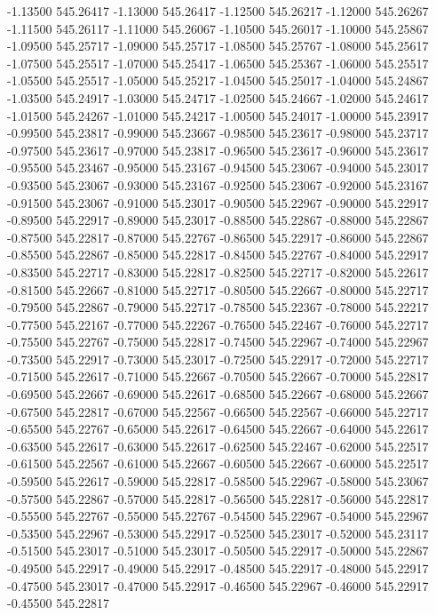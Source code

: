 {-1.13500 545.26417
-1.13000 545.26417
-1.12500 545.26217
-1.12000 545.26267
-1.11500 545.26117
-1.11000 545.26067
-1.10500 545.26017
-1.10000 545.25867
-1.09500 545.25717
-1.09000 545.25717
-1.08500 545.25767
-1.08000 545.25617
-1.07500 545.25517
-1.07000 545.25417
-1.06500 545.25367
-1.06000 545.25517
-1.05500 545.25517
-1.05000 545.25217
-1.04500 545.25017
-1.04000 545.24867
-1.03500 545.24917
-1.03000 545.24717
-1.02500 545.24667
-1.02000 545.24617
-1.01500 545.24267
-1.01000 545.24217
-1.00500 545.24017
-1.00000 545.23917
-0.99500 545.23817
-0.99000 545.23667
-0.98500 545.23617
-0.98000 545.23717
-0.97500 545.23617
-0.97000 545.23817
-0.96500 545.23617
-0.96000 545.23617
-0.95500 545.23467
-0.95000 545.23167
-0.94500 545.23067
-0.94000 545.23017
-0.93500 545.23067
-0.93000 545.23167
-0.92500 545.23067
-0.92000 545.23167
-0.91500 545.23067
-0.91000 545.23017
-0.90500 545.22967
-0.90000 545.22917
-0.89500 545.22917
-0.89000 545.23017
-0.88500 545.22867
-0.88000 545.22867
-0.87500 545.22817
-0.87000 545.22767
-0.86500 545.22917
-0.86000 545.22867
-0.85500 545.22867
-0.85000 545.22817
-0.84500 545.22767
-0.84000 545.22917
-0.83500 545.22717
-0.83000 545.22817
-0.82500 545.22717
-0.82000 545.22617
-0.81500 545.22667
-0.81000 545.22717
-0.80500 545.22667
-0.80000 545.22717
-0.79500 545.22867
-0.79000 545.22717
-0.78500 545.22367
-0.78000 545.22217
-0.77500 545.22167
-0.77000 545.22267
-0.76500 545.22467
-0.76000 545.22717
-0.75500 545.22767
-0.75000 545.22817
-0.74500 545.22967
-0.74000 545.22967
-0.73500 545.22917
-0.73000 545.23017
-0.72500 545.22917
-0.72000 545.22717
-0.71500 545.22617
-0.71000 545.22667
-0.70500 545.22667
-0.70000 545.22817
-0.69500 545.22667
-0.69000 545.22617
-0.68500 545.22667
-0.68000 545.22667
-0.67500 545.22817
-0.67000 545.22567
-0.66500 545.22567
-0.66000 545.22717
-0.65500 545.22767
-0.65000 545.22617
-0.64500 545.22667
-0.64000 545.22617
-0.63500 545.22617
-0.63000 545.22617
-0.62500 545.22467
-0.62000 545.22517
-0.61500 545.22567
-0.61000 545.22667
-0.60500 545.22667
-0.60000 545.22517
-0.59500 545.22617
-0.59000 545.22817
-0.58500 545.22967
-0.58000 545.23067
-0.57500 545.22867
-0.57000 545.22817
-0.56500 545.22817
-0.56000 545.22817
-0.55500 545.22767
-0.55000 545.22767
-0.54500 545.22967
-0.54000 545.22967
-0.53500 545.22967
-0.53000 545.22917
-0.52500 545.23017
-0.52000 545.23117
-0.51500 545.23017
-0.51000 545.23017
-0.50500 545.22917
-0.50000 545.22867
-0.49500 545.22917
-0.49000 545.22917
-0.48500 545.22917
-0.48000 545.22917
-0.47500 545.23017
-0.47000 545.22917
-0.46500 545.22967
-0.46000 545.22917
-0.45500 545.22817
}
